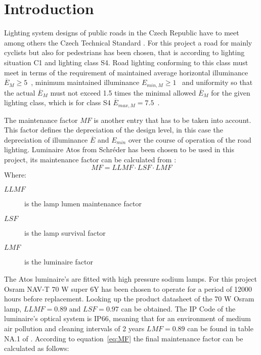 \section{Introduction}
\label{sec:Road_Lighting_Design}
Lighting system designs of public roads in the Czech Republic have to meet among others the Czech Technical Standard \cite{CSN_EN_13201-2}. For this project a road for mainly cyclists but also for pedestrians has been chosen, that is according to \cite{CSN_EN_13201-1} lighting situation C1 and lighting class S4. Road lighting conforming to this class must meet in terms of \cite{CSN_EN_13201-2} the requirement of maintained average horizontal illuminance $\overline{E}_{M}\geq 5$~, minimum maintained illuminance $E_{min,M}\geq 1$~ and uniformity so that the actual $\overline{E}_{M}$ must not exceed 1.5 times the minimal allowed $\overline{E}_{M}$ for the given lighting class, which is for class S4 $\overline{E}_{max,M} = 7.5$~.

The maintenance factor $MF$ is another entry that has to be taken into account. This factor defines the depreciation of the design level, in this case the depreciation of illuminance $\overline{E}$ and $E_{min}$ over the course of operation of the road lighting. Luminaire Atos from Schr\'{e}der has been chosen to be used in this project, its maintenance factor can be calculated from \cite{CSN_EN_13201-2_Z1}:
\begin{equation} \label{eq:MF}
MF = LLMF \cdot LSF \cdot LMF
\end{equation}
Where:
\begin{description}
	\item[$LLMF$] is the lamp lumen maintenance factor
	\item[$LSF$] is the lamp survival factor
	\item[$LMF$] is the luminaire factor
\end{description}

The Atos luminaire's are fitted with high pressure sodium lamps. For this project Osram NAV-T 70 W super 6Y has been chosen to operate for a period of 12000 hours before replacement. Looking up the product datasheet \cite{Osram} of the 70 W Osram lamp, $LLMF=0.89$ and $LSF=0.97$ can be obtained. The IP Code of the luminaire's optical system is IP66, meaning that for an environment of medium air pollution and cleaning intervals of 2 years $LMF=0.89$ can be found in table NA.1 of \cite{CSN_EN_13201-2_Z1}. According to equation~\ref{eq:MF} the final maintenance factor can be calculated as follows:

